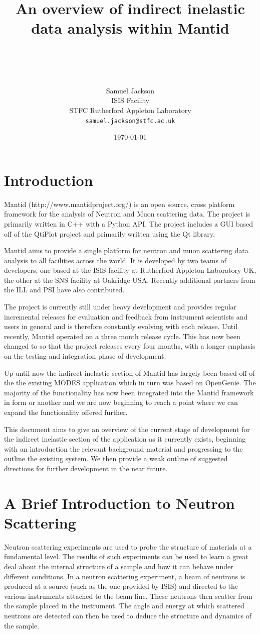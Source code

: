 \documentclass[paper=a4, fontsize=11pt]{scrartcl}	%
\title{ \vspace{-1in} 	\usefont{OT1}{bch}{b}{n}
		\huge \strut An overview of indirect inelastic data analysis within Mantid\strut \\
}
\author{ 									\usefont{OT1}{bch}{m}{n}
        Samuel Jackson\\		\usefont{OT1}{bch}{m}{n}
		ISIS Facility\\	\usefont{OT1}{bch}{m}{n}
        STFC Rutherford Appleton Laboratory\\
        \texttt{samuel.jackson@stfc.ac.uk}
}
\date{\today}
\numberwithin{equation}{section}															%
\numberwithin{figure}{section}																%
\numberwithin{table}{section}																%
\begin{document}
\maketitle
\clearpage
\tableofcontents
\section{Introduction}
Mantid (http://www.mantidproject.org/) is an open source, cross platform framework for the analysis of Neutron and Muon scattering data. The project is primarily written in C++ with a Python API. The project includes a GUI based off of the QtiPlot project and primarily written using the Qt library.

Mantid aims to provide a single platform for neutron and muon scattering data analysis to all facilities across the world. It is developed by two teams of developers, one based at the ISIS facility at Rutherford Appleton Laboratory UK, the other at the SNS facility at Oakridge USA. Recently additional partners from the ILL and PSI have also contributed.

The project is currently still under heavy development and provides regular incremental releases for evaluation and feedback from instrument scientists and users in general and is therefore constantly evolving with each release. Until recently, Mantid operated on a three month release cycle. This has now been changed to so that the project releases every four months, with a longer emphasis on the testing and integration phase of development.

Up until now the indirect inelastic section of Mantid has largely been based off of the the existing MODES application which in turn was based on OpenGenie\cite{wshowells2010}. The majority of the functionality has now been integrated into the Mantid framework in form or another and we are now beginning to reach a point where we can expand the functionality offered further.

This document aims to give an overview of the current stage of development for the indirect inelastic section of the application as it currently exists, beginning with an introduction the relevant background material and progressing to the outline the existing system. We then provide a weak outline of suggested directions for further development in the near future.

\section{A Brief Introduction to Neutron Scattering}
Neutron scattering experiments are used to probe the structure of materials at a fundamental level. The results of such experiments can be used to learn a great deal about the internal structure of a sample and how it can behave under different conditions. In a neutron scattering experiment, a beam of neutrons is produced at a source (such as the one provided by ISIS) and directed to the various instruments attached to the beam line. These neutrons then scatter from the sample placed in the instrument. The angle and energy at which scattered neutrons are detected can then be used to deduce the structure and dynamics of the sample.
\end{document}
